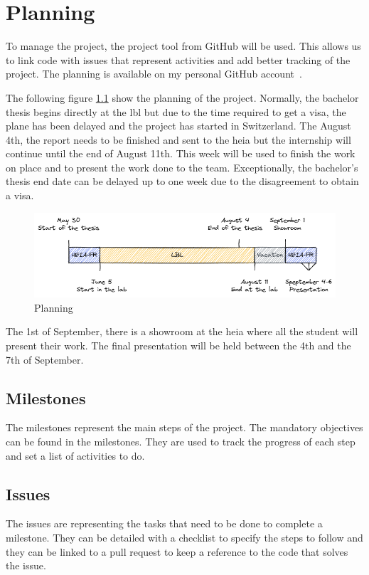 \chapter{Planning}
\label{spec:ch:planning}

To manage the project, the project tool from GitHub will be used.
This allows us to link code with issues that represent activities and add better tracking of the project.
The planning is available on my personal GitHub account~\cite{github-project}.

The following figure \ref{spec:fig:planning} show the planning of the project.
Normally, the bachelor thesis begins directly at the \acrshort{lbl} but due to the time required to get a visa, the plane has been delayed and the project has started in Switzerland.
The August 4th, the report needs to be finished and sent to the \acrshort{heia} but the internship will continue until the end of August 11th.
This week will be used to finish the work on place and to present the work done to the team.
Exceptionally, the bachelor's thesis end date can be delayed up to one week due to the disagreement to obtain a visa.

\begin{figure}[ht]
    \centering
    \includegraphics[width=\textwidth]{05-resources/img/spec/planning.excalidraw.png}
    \caption{Planning}
    \label{spec:fig:planning}
\end{figure}

The 1st of September, there is a showroom at the \acrshort{heia} where all the student will present their work.
The final presentation will be held between the 4th and the 7th of September.

\section{Milestones}
\label{spec:ch:planning:milestones}

The milestones represent the main steps of the project.
The mandatory objectives can be found in the milestones.
They are used to track the progress of each step and set a list of activities to do.


\section{Issues}
\label{spec:ch:planning:issues}

The issues are representing the tasks that need to be done to complete a milestone.
They can be detailed with a checklist to specify the steps to follow and they can be linked to a pull request to keep a reference to the code that solves the issue.

